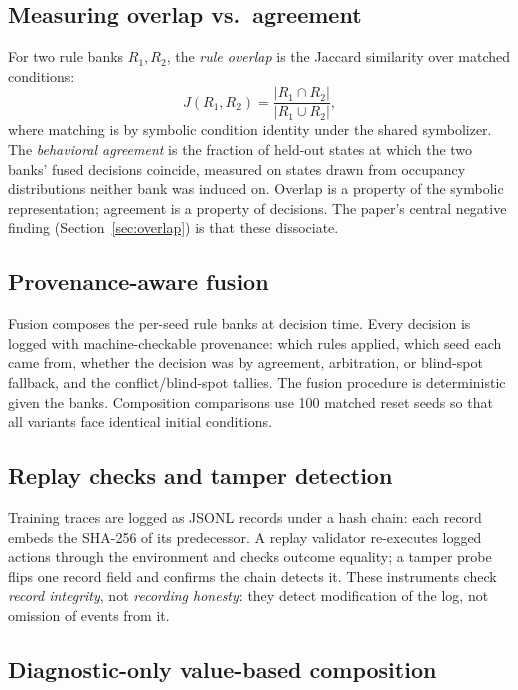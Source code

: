 \documentclass[11pt]{article}
\begin{document}
\subsection{Measuring overlap vs.\ agreement}

For two rule banks $R_1, R_2$, the \textit{rule overlap} is the Jaccard similarity over matched conditions:
\begin{equation}
J(R_1, R_2) = \frac{|R_1 \cap R_2|}{|R_1 \cup R_2|},
\end{equation}
where matching is by symbolic condition identity under the shared symbolizer. The \textit{behavioral agreement} is the fraction of held-out states at which the two banks' fused decisions coincide, measured on states drawn from occupancy distributions neither bank was induced on. Overlap is a property of the symbolic representation; agreement is a property of decisions. The paper's central negative finding (Section~\ref{sec:overlap}) is that these dissociate.

\subsection{Provenance-aware fusion}
\label{sec:fusion-method}

Fusion composes the per-seed rule banks at decision time. Every decision is logged with machine-checkable provenance: which rules applied, which seed each came from, whether the decision was by agreement, arbitration, or blind-spot fallback, and the conflict/blind-spot tallies. The fusion procedure is deterministic given the banks. Composition comparisons use 100 matched reset seeds so that all variants face identical initial conditions.

\subsection{Replay checks and tamper detection}

Training traces are logged as JSONL records under a hash chain: each record embeds the SHA-256 of its predecessor. A replay validator re-executes logged actions through the environment and checks outcome equality; a tamper probe flips one record field and confirms the chain detects it. These instruments check \textit{record integrity}, not \textit{recording honesty}: they detect modification of the log, not omission of events from it.

\subsection{Diagnostic-only value-based composition}
\end{document}
